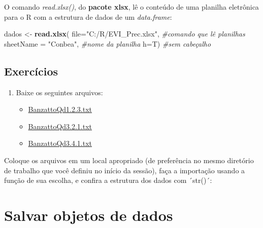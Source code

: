 \documentclass[
]{book}
\newenvironment{Shaded}{\begin{snugshade}}{\end{snugshade}}
\newcommand{\CommentTok}[1]{\textcolor[rgb]{0.56,0.35,0.01}{\textit{#1}}}
\newcommand{\DataTypeTok}[1]{\textcolor[rgb]{0.13,0.29,0.53}{#1}}
\newcommand{\KeywordTok}[1]{\textcolor[rgb]{0.13,0.29,0.53}{\textbf{#1}}}
\newcommand{\NormalTok}[1]{#1}
\newcommand{\StringTok}[1]{\textcolor[rgb]{0.31,0.60,0.02}{#1}}
\providecommand{\tightlist}{%
  \setlength{\itemsep}{0pt}\setlength{\parskip}{0pt}}
\begin{document}
O comando \emph{read.xlsx()}, do \textbf{pacote xlsx}, lê o conteúdo de uma planilha eletrônica para o R com a estrutura de dados de um \emph{data.frame}:

\begin{Shaded}
\begin{Highlighting}[]
\NormalTok{dados <-}\StringTok{ }\KeywordTok{read.xlsx}\NormalTok{(}
                    \DataTypeTok{file=}\StringTok{"C:/R/EVI_Prec.xlsx"}\NormalTok{,     }\CommentTok{#comando que lê planilhas}
                    \DataTypeTok{sheetName =} \StringTok{"Conbea"}\NormalTok{,          }\CommentTok{#nome da planilha}
                    \DataTypeTok{h=}\NormalTok{T)                           }\CommentTok{#sem cabeçalho  }
\end{Highlighting}
\end{Shaded}

\hypertarget{exercuxedcios}{%
\subsection{Exercícios}\label{exercuxedcios}}

\begin{enumerate}
\def\labelenumi{\arabic{enumi}.}
\tightlist
\item
  Baixe os seguintes arquivos:

  \begin{itemize}
  \tightlist
  \item
    \href{https://www.dropbox.com/s/uq1n2sv8an2eoan/BanzattoQd1.2.3.txt?dl=1}{BanzattoQd1.2.3.txt}
  \item
    \href{https://www.dropbox.com/s/jjyo8dhyy0qt3ft/BanzattoQd3.2.1.txt?dl=1}{BanzattoQd3.2.1.txt}
  \item
    \href{https://www.dropbox.com/s/yv5clm6qljurzbw/BanzattoQd3.4.1.txt?dl=1}{BanzattoQd3.4.1.txt}
  \end{itemize}
\end{enumerate}

Coloque os arquivos em um local apropriado (de preferência no mesmo diretório de trabalho que você definiu no início da sessão), faça a importação usando a função de sua escolha, e confira a estrutura dos dados com ´str()´:

\hypertarget{salvar-objetos-de-dados}{%
\section{Salvar objetos de dados}\label{salvar-objetos-de-dados}}
\end{document}
